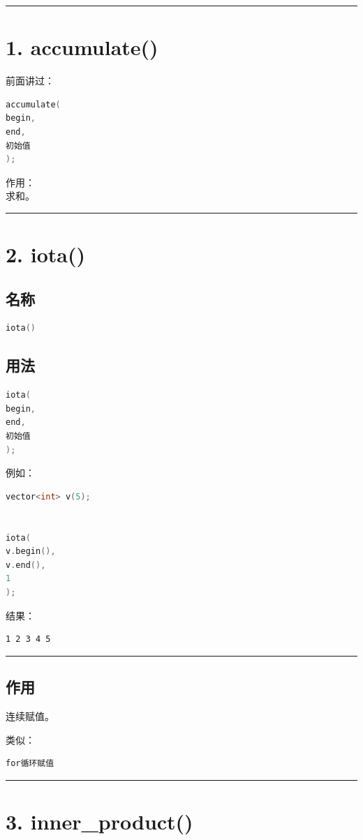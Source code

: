 \documentclass[9pt,twocolumn]{extarticle}
\begin{document}
\noindent\rule{\linewidth}{0.4pt}

\section{1. accumulate()}

前面讲过：
\begin{lstlisting}[language=C++]
accumulate(
begin,
end,
初始值
);
\end{lstlisting}
作用：\\
求和。

\noindent\rule{\linewidth}{0.4pt}

\section{2. iota()}

\subsection{名称}
\begin{lstlisting}[language=C++]
iota()
\end{lstlisting}

\subsection{用法}
\begin{lstlisting}[language=C++]
iota(
begin,
end,
初始值
);
\end{lstlisting}
例如：
\begin{lstlisting}[language=C++]
vector<int> v(5);


iota(
v.begin(),
v.end(),
1
);
\end{lstlisting}
结果：
\begin{lstlisting}
1 2 3 4 5
\end{lstlisting}

\noindent\rule{\linewidth}{0.4pt}

\subsection{作用}
连续赋值。

类似：
\begin{lstlisting}[language=C++]
for循环赋值
\end{lstlisting}

\noindent\rule{\linewidth}{0.4pt}

\section{3. inner\_product()}
\end{document}
